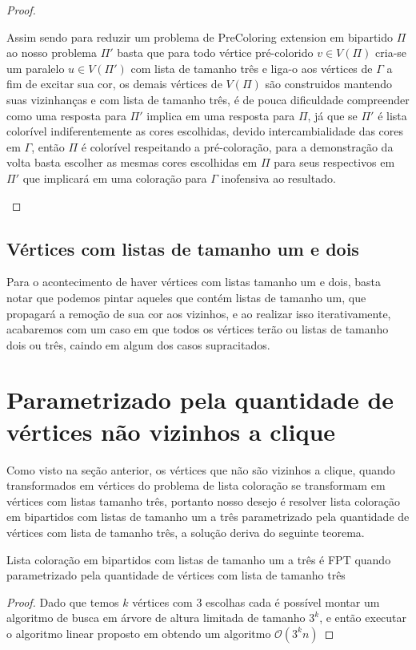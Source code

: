 \begin{proof}
\begin{itemize}
   Assim sendo para reduzir um problema de PreColoring extension em bipartido $\Pi$ ao nosso problema $\Pi'$ basta que para todo vértice pré-colorido $v \in V(\Pi)$ cria-se um paralelo $u \in V(\Pi')$ com lista de tamanho três e liga-o aos vértices de $\Gamma$ a fim de excitar sua cor, os demais vértices de $V(\Pi)$ são construidos mantendo suas vizinhanças e com lista de tamanho três, é de pouca dificuldade compreender como uma resposta para $\Pi'$ implica em uma resposta para $\Pi$, já que se $\Pi'$ é lista colorível indiferentemente as cores escolhidas, devido intercambialidade das cores em $\Gamma$, então $\Pi$ é colorível respeitando a pré-coloração, para a demonstração da volta basta escolher as mesmas cores escolhidas em $\Pi$ para seus respectivos em $\Pi'$ que implicará em uma coloração para $\Gamma$ inofensiva ao resultado. 
 \end{itemize}
\end{proof}

\subsection{Vértices com listas de tamanho um e dois}

Para o acontecimento de haver vértices com listas tamanho um e dois, basta notar que podemos pintar aqueles que contém listas de tamanho um, que propagará a remoção de sua cor aos vizinhos, e ao realizar isso iterativamente, acabaremos com um caso em que todos os vértices terão ou listas de tamanho dois ou três, caindo em algum dos casos supracitados.

\section{Parametrizado pela quantidade de vértices não vizinhos a clique}
Como visto na seção anterior, os vértices que não são vizinhos a clique, quando transformados em vértices do problema de lista coloração se transformam em vértices com listas tamanho três, portanto nosso desejo é resolver lista coloração em bipartidos com listas de tamanho um a três parametrizado pela quantidade de vértices com lista de tamanho três, a solução deriva do seguinte teorema.

\begin{teorema}
 Lista coloração em bipartidos com listas de tamanho um a três é FPT quando parametrizado pela quantidade de vértices com lista de tamanho três
\end{teorema}
\begin{proof}
 Dado que temos $k$ vértices com 3 escolhas cada é possível montar um algoritmo de busca em árvore de altura limitada de tamanho $3^k$, e então executar o algoritmo linear proposto em \cite{hujter93} obtendo um algoritmo $\mathcal{O}(3^kn)$
 
\end{proof}
